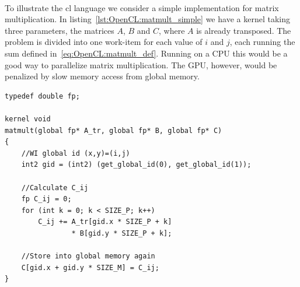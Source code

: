 \paragraph{}
To illustrate the cl language we consider a simple implementation for matrix multiplication.
In listing~\ref{lst:OpenCL:matmult_simple} we have a kernel taking three parameters, the matrices $A$, $B$ and $C$, where $A$ is already transposed.
The problem is divided into one work-item for each value of $i$ and $j$, each running the sum defined in~\eqref{eq:OpenCL:matmult_def}.
Running on a CPU this would be a good way to parallelize matrix multiplication.
The GPU, however, would be penalized by slow memory access from global memory.
\begin{lstlisting}[float,caption={Simple matrix multiplication in OpenCL. The matrices $A$, $B$ and $C$ refers to the same matrices as in eq.~\eqref{eq:OpenCL:matmult_def}. The left matrix, $A$ is already transposed, `A\_tr', to improve access pattern.},label={lst:OpenCL:matmult_simple}]
typedef double fp;

kernel void
matmult(global fp* A_tr, global fp* B, global fp* C)
{
    //WI global id (x,y)=(i,j)
    int2 gid = (int2) (get_global_id(0), get_global_id(1));

    //Calculate C_ij
    fp C_ij = 0;
    for (int k = 0; k < SIZE_P; k++)
        C_ij += A_tr[gid.x * SIZE_P + k] 
                * B[gid.y * SIZE_P + k];

    //Store into global memory again
    C[gid.x + gid.y * SIZE_M] = C_ij;
}
\end{lstlisting}



